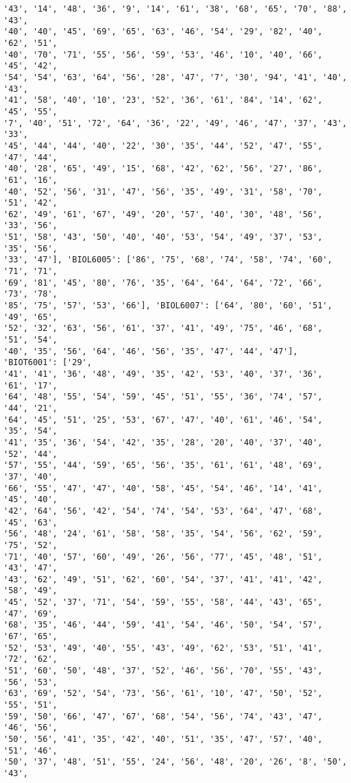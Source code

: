 \documentclass[11pt]{article}
\begin{document}
\begin{Verbatim}[commandchars=\\\{\}]
'43', '14', '48', '36', '9', '14', '61', '38', '68', '65', '70', '88', '43',
'40', '40', '45', '69', '65', '63', '46', '54', '29', '82', '40', '62', '51',
'40', '70', '71', '55', '56', '59', '53', '46', '10', '40', '66', '45', '42',
'54', '54', '63', '64', '56', '28', '47', '7', '30', '94', '41', '40', '43',
'41', '58', '40', '10', '23', '52', '36', '61', '84', '14', '62', '45', '55',
'7', '40', '51', '72', '64', '36', '22', '49', '46', '47', '37', '43', '33',
'45', '44', '44', '40', '22', '30', '35', '44', '52', '47', '55', '47', '44',
'40', '28', '65', '49', '15', '68', '42', '62', '56', '27', '86', '61', '16',
'40', '52', '56', '31', '47', '56', '35', '49', '31', '58', '70', '51', '42',
'62', '49', '61', '67', '49', '20', '57', '40', '30', '48', '56', '33', '56',
'51', '58', '43', '50', '40', '40', '53', '54', '49', '37', '53', '35', '56',
'33', '47'], 'BIOL6005': ['86', '75', '68', '74', '58', '74', '60', '71', '71',
'69', '81', '45', '80', '76', '35', '64', '64', '64', '72', '66', '73', '78',
'85', '75', '57', '53', '66'], 'BIOL6007': ['64', '80', '60', '51', '49', '65',
'52', '32', '63', '56', '61', '37', '41', '49', '75', '46', '68', '51', '54',
'40', '35', '56', '64', '46', '56', '35', '47', '44', '47'], 'BIOT6001': ['29',
'41', '41', '36', '48', '49', '35', '42', '53', '40', '37', '36', '61', '17',
'64', '48', '55', '54', '59', '45', '51', '55', '36', '74', '57', '44', '21',
'64', '45', '51', '25', '53', '67', '47', '40', '61', '46', '54', '35', '54',
'41', '35', '36', '54', '42', '35', '28', '20', '40', '37', '40', '52', '44',
'57', '55', '44', '59', '65', '56', '35', '61', '61', '48', '69', '37', '40',
'66', '55', '47', '47', '40', '58', '45', '54', '46', '14', '41', '45', '40',
'42', '64', '56', '42', '54', '74', '54', '53', '64', '47', '68', '45', '63',
'56', '48', '24', '61', '58', '58', '35', '54', '56', '62', '59', '75', '52',
'71', '40', '57', '60', '49', '26', '56', '77', '45', '48', '51', '43', '47',
'43', '62', '49', '51', '62', '60', '54', '37', '41', '41', '42', '58', '49',
'45', '52', '37', '71', '54', '59', '55', '58', '44', '43', '65', '47', '69',
'68', '35', '46', '44', '59', '41', '54', '46', '50', '54', '57', '67', '65',
'52', '53', '49', '40', '55', '43', '49', '62', '53', '51', '41', '72', '62',
'51', '60', '50', '48', '37', '52', '46', '56', '70', '55', '43', '56', '53',
'63', '69', '52', '54', '73', '56', '61', '10', '47', '50', '52', '55', '51',
'59', '50', '66', '47', '67', '68', '54', '56', '74', '43', '47', '46', '56',
'50', '56', '41', '35', '42', '40', '51', '35', '47', '57', '40', '51', '46',
'50', '37', '48', '51', '55', '24', '56', '48', '20', '26', '8', '50', '43',

\end{Verbatim}
\end{document}
